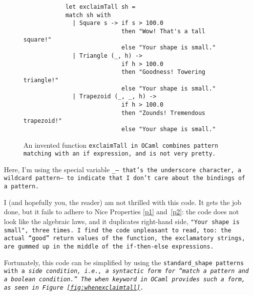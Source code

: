 \documentclass[manuscript,screen,review, 12pt, nonacm]{acmart}
\begin{document}
    \begin{figure}[ht]
        \begin{verbatim}
            let exclaimTall sh =
            match sh with 
              | Square s -> if s > 100.0 
                            then "Wow! That's a tall square!"
                            else "Your shape is small." 
              | Triangle (_, h) -> 
                            if h > 100.0 
                            then "Goodness! Towering triangle!"
                            else "Your shape is small." 
              | Trapezoid (_, _, h) -> 
                            if h > 100.0
                            then "Zounds! Tremendous trapezoid!"
                            else "Your shape is small." 
            \end{verbatim}    
        \caption{An invented function \tt{exclaimTall} in OCaml combines pattern
        matching with an \tt{if} expression, and is not very pretty.}   
        \label{fig:ifexclaimtall}
    \end{figure}
    
    Here, I'm using the special variable \tt{\_}--- that's the underscore
    character, a wildcard pattern--- to indicate that I don't care about the
    bindings of a pattern. 

    I (and hopefully you, the reader) am not thrilled with this code. It gets
    the job done, but it fails to adhere to Nice Properties \ref{p1}
    and~\ref{p2}: the code does not look like the algebraic laws, and it
    duplicates right-hand side, \tt{"Your shape is small"}, three times. I find
    the code unpleasant to read, too: the actual “good” return values of the
    function, the exclamatory strings, are gummed up in the middle of the
    \tt{if-then-else} expressions.
    
    Fortunately, this code can be simplified by using the \tt{standard\_shape} patterns
    with a \it{side condition}, i.e., a syntactic form for “match a pattern
    \it{and} a boolean condition.” The \tt{when} keyword in OCaml provides such
    a form, as seen in Figure~\ref{fig:whenexclaimtall}.
        
\end{document}
